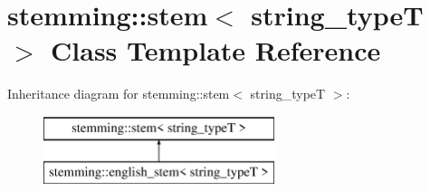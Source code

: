 \hypertarget{classstemming_1_1stem}{\section{stemming\+:\+:stem$<$ string\+\_\+type\+T $>$ Class Template Reference}
\label{classstemming_1_1stem}
}
Inheritance diagram for stemming\+:\+:stem$<$ string\+\_\+type\+T $>$\+:\begin{figure}[H]
\begin{center}
\leavevmode
\includegraphics[height=2.000000cm]{classstemming_1_1stem}
\end{center}
\end{figure}
